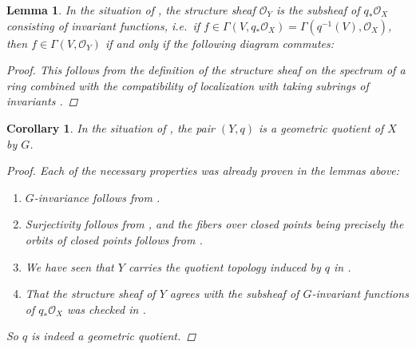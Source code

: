 \documentclass[12pt,a4paper]{amsart}
\theoremstyle{plain}
\newtheorem{lm}[thm]{Lemma}
\newtheorem{cor}[thm]{Corollary}
\theoremstyle{definition}
\theoremstyle{remark}
\begin{document}
\begin{lm}\label{lm:invariantslocalization}
  In the situation of , the structure sheaf $\mathscr{O}_{Y}$ is the subsheaf of $q_{*}\mathscr{O}_{X}$ consisting of invariant functions, i.e.~if $f \in \Gamma(V,q_{*}\mathscr{O}_{X}) = \Gamma(q^{-1}(V),\mathscr{O}_{X})$, then $f \in \Gamma(V, \mathscr{O}_{Y})$ if and only if the following diagram commutes:
  
  \begin{center}
  \end{center}

  \begin{proof}
    This follows from the definition of the structure sheaf on the spectrum of a ring combined with the compatibility of localization with taking subrings of invariants \cite[Exercise 5.12]{am69}.
  \end{proof}

\end{lm}

\begin{cor}\label{cor:affinequotient}
  In the situation of , the pair $(Y,q)$ is a geometric quotient of $X$ by $G$.

  \begin{proof}
    Each of the necessary properties was already proven in the lemmas above:
    \begin{enumerate}
      \item $G$-invariance follows from .
      \item Surjectivity follows from , and the fibers over closed points being precisely the orbits of closed points follows from .
      \item We have seen that $Y$ carries the quotient topology induced by $q$ in .
      \item That the structure sheaf of $Y$ agrees with the subsheaf of $G$-invariant functions of $q_{*}\mathscr{O}_{X}$ was checked in .
    \end{enumerate}
    So $q$ is indeed a geometric quotient.  
  \end{proof}

\end{cor}
\end{document}

